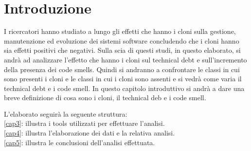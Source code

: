 \chapter{Introduzione}
I ricercatori hanno studiato a lungo gli effetti che hanno i cloni sulla gestione, manutenzione ed evoluzione dei sistemi software concludendo che i cloni hanno sia effetti positivi che negativi. Sulla scia di questi studi, in questo elaborato, si andrà ad analizzare l'effetto che hanno i cloni sul technical debt e sull'incremento della presenza dei code smells. Quindi si andranno a confrontare le classi in cui sono presenti i cloni e le classi in cui i cloni sono assenti e si vedrà come varia il technical debt e i code smell. In questo capitolo introduttivo si andrà a dare una breve definizione di cosa sono i cloni, il technical deb e i code smell.



L'elaborato seguirà la seguente struttura:\\
\autoref{cap3}: illustra i tools utilizzati per effettuare l'analisi.\\
\autoref{cap4}: illustra l'elaborazione dei dati e la relativa analisi.\\
\autoref{cap5}: illustra le conclusioni dell'analisi effettuata.
